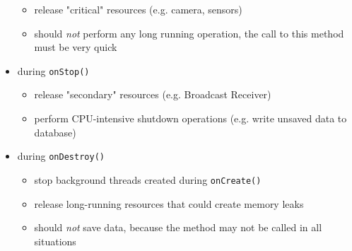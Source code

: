 \documentclass[11pt,a4paper,notitlepage]{article}
\begin{document}
\begin{itemize}
\begin{itemize}
		\item release "critical" resources (e.g. camera, sensors)
		\item should \textit{not} perform any long running operation, the call to this method must be very quick
	\end{itemize}
	\item during \texttt{onStop()}
	\begin{itemize}
		\item release "secondary" resources (e.g. Broadcast Receiver)
		\item perform CPU-intensive shutdown operations (e.g. write unsaved data to database)
	\end{itemize}
	\item during \texttt{onDestroy()}
	\begin{itemize}
		\item stop background threads created during \texttt{onCreate()}
		\item release long-running resources that could create memory leaks
		\item should \textit{not} save data, because the method may not be called in all situations
	\end{itemize}

\end{itemize}
\end{document}
